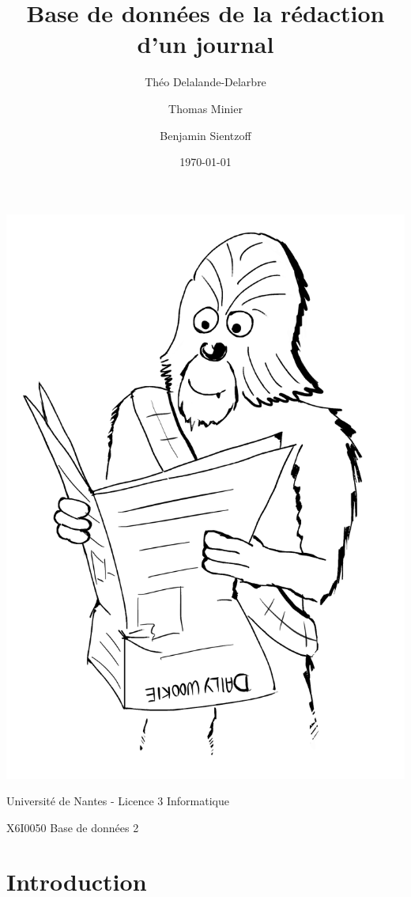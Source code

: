 \documentclass[a4paper]{article}
\title{Base de données de la rédaction d'un journal}
\author{Théo Delalande-Delarbre \and Thomas Minier \and Benjamin Sientzoff}
\date{\today}
\begin{document}
\maketitle
\begin{center}
    \includegraphics[scale=0.5]{images/wookie-hebdo.png}
\end{center}
\par{Université de Nantes - Licence 3 Informatique}
\par{\textsc{X6I0050} Base de données 2}

\newpage
\tableofcontents

\newpage

\section*{Introduction}
    
    
\end{document}
